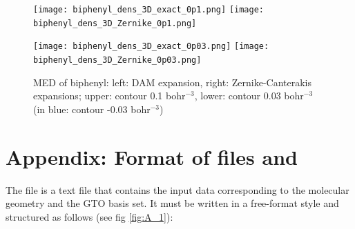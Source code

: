 \documentclass[10pt]{article}
\begin{document}
\begin{figure}[H]
\begin{center}
\texttt{[image: biphenyl\_dens\_3D\_exact\_0p1.png]}
\hspace*{5mm}
\texttt{[image: biphenyl\_dens\_3D\_Zernike\_0p1.png]}

\texttt{[image: biphenyl\_dens\_3D\_exact\_0p03.png]}
\hspace*{5mm}
\texttt{[image: biphenyl\_dens\_3D\_Zernike\_0p03.png]}
\end{center}
\caption[3D MED Zernike-Canterakis expansions of biphenyl]{ MED of biphenyl: left: DAM expansion, right: Zernike-Canterakis expansions;
upper: contour 0.1 bohr$^{-3}$, lower: contour 0.03 bohr$^{-3}$ (in blue: contour -0.03 bohr$^{-3}$)
\label{fig:6_9_2}}
\end{figure}



\newpage

\appendix

\section{Appendix: Format of files \ggbs{ } and \den
\label{A1}}

The \ggbs{ } file is a text file that contains the 
input data corresponding to the molecular geometry and the GTO basis set. 
It must be written in a free-format style and structured as follows 
(see fig \ref{fig:A_1}):
\end{document}
